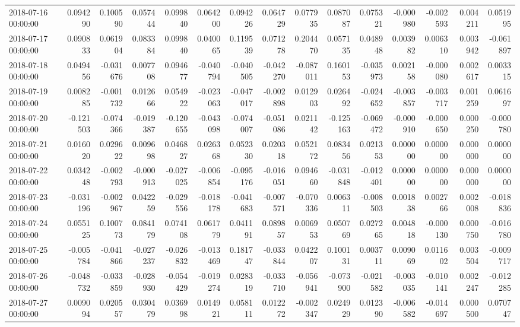\begin{tabular}{lrrrrrrrrrrrrrr}
2018-07-16 00:00:00 & 0.094290 & 0.100590 & 0.057444 & 0.099840 & 0.064200 & 0.094226 & 0.064729 & 0.077935 & 0.087087 & 0.075321 & -0.000980 & -0.002593 & 0.004211 & 0.051995 \\
2018-07-17 00:00:00 & 0.090833 & 0.061904 & 0.083384 & 0.099840 & 0.040065 & 0.119539 & 0.071278 & 0.204470 & 0.057135 & 0.048948 & 0.003982 & 0.006310 & 0.003942 & -0.061897 \\
2018-07-18 00:00:00 & 0.049456 & -0.031676 & 0.007708 & 0.094677 & -0.040794 & -0.040505 & -0.042270 & -0.087011 & 0.160153 & -0.035973 & 0.002158 & -0.000080 & 0.002617 & 0.003315 \\
2018-07-19 00:00:00 & 0.008285 & -0.001732 & 0.012666 & 0.054922 & -0.023063 & -0.047017 & -0.002898 & 0.012903 & 0.026492 & -0.024652 & -0.003857 & -0.003717 & 0.001259 & 0.061697 \\
2018-07-20 00:00:00 & -0.121503 & -0.074366 & -0.019387 & -0.120655 & -0.043098 & -0.074007 & -0.051086 & 0.021142 & -0.125163 & -0.069472 & -0.000910 & -0.000650 & 0.000250 & -0.000780 \\
2018-07-21 00:00:00 & 0.016020 & 0.029622 & 0.009698 & 0.046827 & 0.026368 & 0.052330 & 0.020318 & 0.052172 & 0.083456 & 0.021353 & 0.000000 & 0.000000 & 0.000000 & 0.000000 \\
2018-07-22 00:00:00 & 0.034248 & -0.002793 & -0.000913 & -0.027025 & -0.006854 & -0.095176 & -0.016051 & 0.094660 & -0.031848 & -0.012401 & 0.000000 & 0.000000 & 0.000000 & 0.000000 \\
2018-07-23 00:00:00 & -0.031196 & -0.002967 & 0.042259 & -0.029556 & -0.018178 & -0.041683 & -0.007571 & -0.070336 & 0.006311 & -0.008503 & 0.001838 & 0.002766 & 0.002008 & -0.018836 \\
2018-07-24 00:00:00 & 0.055125 & 0.100773 & 0.084179 & 0.074108 & 0.061779 & 0.041191 & 0.089857 & 0.006953 & 0.050769 & 0.027265 & 0.004818 & -0.000130 & 0.000750 & -0.016780 \\
2018-07-25 00:00:00 & -0.005784 & -0.041866 & -0.027237 & -0.026832 & -0.013469 & 0.181747 & -0.033844 & 0.042207 & 0.100131 & 0.003711 & 0.009069 & 0.011602 & 0.003504 & -0.009717 \\
2018-07-26 00:00:00 & -0.048732 & -0.033859 & -0.028930 & -0.054429 & -0.019274 & 0.028319 & -0.033710 & -0.056941 & -0.073900 & -0.021582 & -0.003035 & -0.010141 & 0.002247 & -0.012285 \\
2018-07-27 00:00:00 & 0.009094 & 0.020557 & 0.030479 & 0.036998 & 0.014921 & 0.058111 & 0.012272 & -0.002347 & 0.024929 & 0.012390 & -0.006582 & -0.014697 & 0.000500 & 0.070747 \\

\end{tabular}
